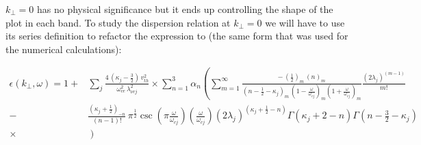 \documentclass[12pt,a4paper]{article}
\begin{document}
    $k_\perp = 0$ has no physical significance but it ends up controlling the shape of the plot in each band. To study the dispersion relation at $k_\perp = 0$ we will have to use its series definition to refactor the expression to (the same form that was used for the numerical calculations):

    \begin{align}
        \epsilon(k_\perp, \omega) = 1 +& \sum_j \frac{4 \, (\kappa_j - \frac{3}{2}) \, v^2_{th}}{\omega^2_{ce} \, \lambda^2_{\nu c j}} \times \sum_{n = 1}^3 \alpha_n \left( \sum_{m = 1}^\infty \frac{ -\, (\frac{1}{2})_m \, (n)_m }{(n - \frac{1}{2} - \kappa_j)_m \, (1 - \frac{\omega}{\omega_{cj}})_m (1 + \frac{\omega}{\omega_{cj}})_m } \frac{(2 \lambda_j)^{(m - 1)}}{m!} \right. \\
        -& \left. \frac{(\kappa_j + \frac{1}{2})_{-n}}{(n - 1)!} \, \pi^{\frac{1}{2}} \csc\left(\pi \frac{\omega}{\omega_{cj}}\right) \left(\frac{\omega}{\omega_{cj}}\right) (2 \lambda_j)^{(\kappa_j + \frac{1}{2} - n)} \Gamma(\kappa_j + 2 - n) \Gamma(n - \frac{3}{2} - \kappa_j) \right.\\
        \times& \left. \right)
    \end{align}
\end{document}
